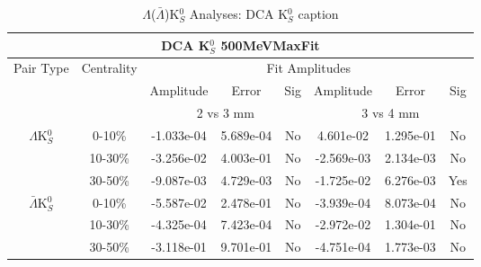 \documentclass[../AnalysisNoteJBuxton.tex]{subfiles}
\begin{document}
\begin{table}
 \centering
 \begin{tabular}{|c|c|c|c|c||c|c|c|}
  \multicolumn{8}{c}{DCA K$^{0}_{S}$ 500MeVMaxFit} \\
  \hline
  \multirow{3}{*}{Pair Type} & \multirow{3}{*}{Centrality} & \multicolumn{6}{c|}{Fit Amplitudes} \\
  \cline{3-8}
   & & Amplitude & Error & Sig & Amplitude & Error & Sig \\  
  \cline{3-8}
   & & \multicolumn{3}{c||}{2 vs 3 mm} & \multicolumn{3}{c|}{3 vs 4 mm} \\  
  \hline  
  \multirow{3}{*}{$\Lambda$K$^{0}_{S}$}  
   &  0-10\% & -1.033e-04 & 5.689e-04 & No & 4.601e-02 & 1.295e-01 & No \\
   & 10-30\% & -3.256e-02 & 4.003e-01 & No & -2.569e-03 & 2.134e-03 & No \\
   & 30-50\% & -9.087e-03 & 4.729e-03 & No & -1.725e-02 & 6.276e-03 & Yes \\
  \hline  
  \multirow{3}{*}{$\bar{\Lambda}$K$^{0}_{S}$}  
   &  0-10\% & -5.587e-02 & 2.478e-01 & No & -3.939e-04 & 8.073e-04 & No \\
   & 10-30\% & -4.325e-04 & 7.423e-04 & No & -2.972e-02 & 1.304e-01 & No \\
   & 30-50\% & -3.118e-01 & 9.701e-01 & No & -4.751e-04 & 1.773e-03 & No \\
  \hline
 \end{tabular}
 \caption{$\Lambda$($\bar{\Lambda}$)K$^{0}_{S}$ Analyses: DCA K$^{0}_{S}$ caption}
 \label{tab:K0DcaLamK0_500MeVMaxFit}
\end{table}
\end{document}
